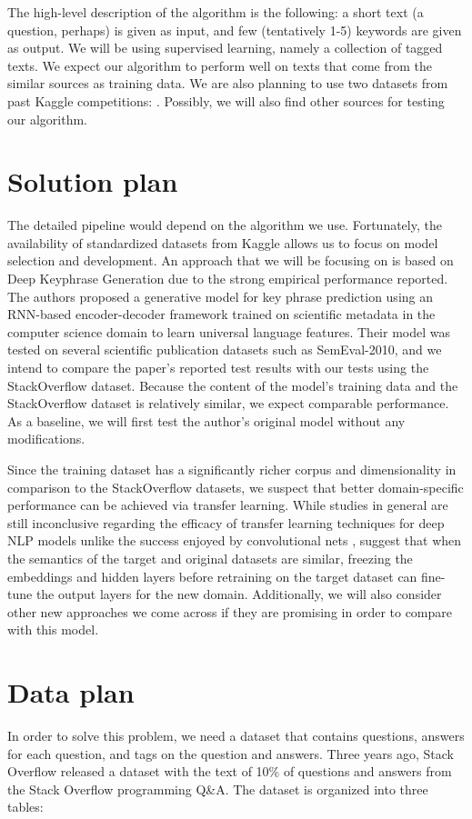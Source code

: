 \documentclass[sigconf,nonacm=True,10pt]{acmart}
\begin{document}
The high-level description of the algorithm is the following: a short text (a question, perhaps) is given as input, and few (tentatively 1-5) keywords are given as output. We will be using supervised learning, namely a collection of tagged texts. We expect our algorithm to perform well on texts that come from the similar sources as training data. We are also planning to use two datasets from past Kaggle competitions: \cite{kaggle1} \cite{kaggle2}. Possibly, we will also find other sources for testing our algorithm.


\section{Solution plan}
The detailed pipeline would depend on the algorithm we use. Fortunately, the availability of standardized datasets from Kaggle allows us to focus on model selection and development. An approach that we will be focusing on is based on Deep Keyphrase Generation \cite{DBLP:journals/corr/MengZHHBC17} due to the strong empirical performance reported. The authors proposed a generative model for key phrase prediction using an RNN-based encoder-decoder framework trained on scientific metadata in the computer science domain to learn universal language features. Their model was tested on several scientific publication datasets such as SemEval-2010, and we intend to compare the paper's reported test results with our tests using the StackOverflow dataset. Because the content of the model's training data and the StackOverflow dataset is relatively similar, we expect comparable performance. As a baseline, we will first test the author's original model without any modifications. 

Since the training dataset has a significantly richer corpus and dimensionality in comparison to the StackOverflow datasets, we suspect that better domain-specific performance can be achieved via transfer learning. While studies in general are still inconclusive regarding the efficacy of transfer learning techniques for deep NLP models unlike the success enjoyed by convolutional nets \cite{DBLP:journals/corr/MouMYLXZJ16}, suggest that when the semantics of the target and original datasets are similar, freezing the embeddings and hidden layers before retraining on the target dataset can fine-tune the output layers for the new domain. Additionally, we will also consider other new approaches we come across if they are promising in order to compare with this model.


\section{Data plan}
In order to solve this problem, we need a dataset that contains questions, answers for each question, and tags on the question and answers. Three years ago, Stack Overflow released a dataset with the text of 10\% of questions and answers from the Stack Overflow programming Q\&A. The dataset is organized into three tables:
\end{document}
